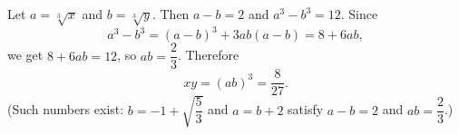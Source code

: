Let $a=\sqrt[3]{x}$ and $b=\sqrt[3]{y}$. Then $a-b=2$ and $a^3-b^3=12$. Since
\[a^3-b^3=(a-b)^3+3ab(a-b)=8+6ab,\]
we get $8+6ab=12$, so $ab=\dfrac23$. Therefore
\[xy=(ab)^3=\boxed{\dfrac{8}{27}}.\]
(Such numbers exist: $b=-1+\sqrt{\dfrac53}$ and $a=b+2$ satisfy $a-b=2$ and $ab=\dfrac23$.)
